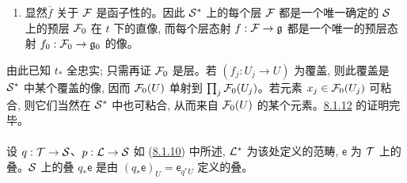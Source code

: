 \begin{enumerate}
\begin{enumerate}
\renewcommand{\theenumii}{\alph{enumii}}
\renewcommand{\labelenumii}{\theenumii)}
\item $t^{\ast}(\nu^i)$、$t^{\ast}(\mu^i)$、$t^{\ast}(e^i_{jk})$ 和 $t^{\ast}(f^i_j)$ 不依赖于 $i$;

\item 固定 $i$ 后, 各 $e^i_{jk}$ 覆盖 $W$, 各 $f^i_j$ 覆盖 $V$。
\end{enumerate}

先由 $(\Ll0)$ 构造 $\mu^1$、$\nu^1$ 和 $\nu^2$, 再如 (ii) 中那样构造各 $\mu_j$。设 $(W'_{jk})$ 为 $W$ 的一个覆盖, 如图所要求的那样映到覆盖 $V_j=t^{\ast}(\mu_j)$。加细 $(W'_{jk})$ 并应用 $(\Ll0)$ 与 $(\Ll1)$ 后, 得到一个所需类型的图, 满足 a) 与 b), 但不一定交换。再次加细并应用 $(\Ll2)$ 即可使它交换。

此时只需考察下列交换图:
\[
\xymatrix@C=1.5cm@R=.25cm{
\Ff(\lambda^{0})\ar[r]^{\bar g}&\Ff(\mu^0)\ar[rd]\ar[rr]^{\bar h}&&
\Ff(\nu^{0})\ar[dddd]\\
&&\Ff(\nu^1)\ar[rddd]&\\
\Ff(\mu^{1})\ar[r]&\prod\Ff(\mu_j)\ar[rrdd]&&&\\
&&&\\
\Ff(\nu^2)\ar[rrr]&&&\prod\Ff(\nu_{jk})
}
\]

\item 显然\pageoriginale $\overline f$ 关于 ${\mathcal F}$ 是函子性的。因此 ${\mathcal S}^{\ast}$ 上的每个层 ${\mathcal F}$ 都是一个唯一确定的 ${\mathcal S}$ 上的预层 ${\mathcal F}_0$ 在 $t$ 下的直像, 而每个层态射 $f:\Ff\to\mathfrak g$ 都是一个唯一的预层态射 $f_0:\Ff_0\to\mathfrak g_0$ 的像。
\end{enumerate}

由此已知 $t_{\ast}$ 全忠实; 只需再证 ${\mathcal F}_0$ 是层。若 $(f_j:U_j\to U)$ 为覆盖, 则此覆盖是 ${\mathcal S}^{\ast}$ 中某个覆盖的像, 因而 ${\mathcal F}_0(U)$ 单射到 $\prod_j{\mathcal F}_0(U_j)$。若元素 $x_j\in{\mathcal F}_0(U_j)$ 可粘合, 则它们当然在 ${\mathcal S}^{\ast}$ 中也可粘合, 从而来自 ${\mathcal F}_0(U)$ 的某个元素。\hyperref[V.prop8.1.12]{8.1.12} 的证明完毕。

\setcounter{subsubsection}{13}
\setcounter{paragraph}{-1}
\paragraph{}

设 $q:\Tt\to\Ss$、$p:\Ll\to\Ss$ 如 (\hyperref[V.subsubsec8.1.10]{8.1.10}) 中所述, ${\mathcal L}^{\ast}$ 为该处定义的范畴, $\mathsf e$ 为 ${\mathcal T}$ 上的叠。${\mathcal S}$ 上的叠 $q_{\ast}\mathsf e$ 是由 $(q_{\ast}\mathsf e)_U=\mathsf e_{q^{\ast}U}$ 定义的叠。

